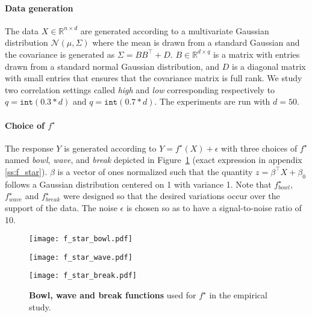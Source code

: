 \documentclass{article}
\newcommand{\RR}{\mathbb{R}}
\newcommand{\Ncal}{\mathcal{N}}
\theoremstyle{plain}
\begin{document}
\paragraph{Data generation}
The data $X \in \RR^{n \times d}$ are generated according to a multivariate Gaussian distribution $\Ncal(\mu, \Sigma)$ where the mean is drawn from a standard Gaussian and the covariance is generated as $\Sigma = B B^\top + D$. $B \in \RR^{d \times q}$ is a matrix with entries drawn from a standard normal Gaussian distribution, and $D$ is a diagonal matrix with small entries that ensures that the covariance matrix is full rank. We study two correlation settings called \emph{high} and \emph{low} corresponding respectively to $q=\texttt{int}(0.3*d)$ and $q=\texttt{int}(0.7*d)$. The experiments are run with $d=50$.

\paragraph{Choice of $f^\star$} The response $Y$ is generated according to $Y = f^\star(X) + \epsilon$ with three choices of $f^\star$ named \emph{bowl}, \emph{wave}, and \emph{break} depicted in Figure~\ref{fig:f_star} (exact expression in appendix \ref{ss:f_star}). $\beta$ is a vector of ones normalized such that the quantity $z = \beta^\top X + \beta_0$ follows a Gaussian distribution centered on 1 with variance 1. Note that $f^\star_{bowl}$, $f^\star_{wave}$ and $f^\star_{break}$ were designed so that the desired variations occur over the support of the data. The noise $\epsilon$ is chosen so as to have a signal-to-noise ratio of 10.
\begin{figure}[h]
    \begin{minipage}{.32\linewidth}
	\caption{\textbf{Bowl, wave and break functions} used for $f^\star$ in the empirical study.}
	\label{fig:f_star}
    \end{minipage}%
    \hfill%
    \begin{minipage}{.18\linewidth}
	\texttt{[image: f\_star\_bowl.pdf]}
    \end{minipage}%
    \hfill%
    \begin{minipage}{.18\linewidth}
	\texttt{[image: f\_star\_wave.pdf]}
    \end{minipage}%
    \hfill%
    \begin{minipage}{.18\linewidth}
	\texttt{[image: f\_star\_break.pdf]}
    \end{minipage}%
\end{figure}
\end{document}
